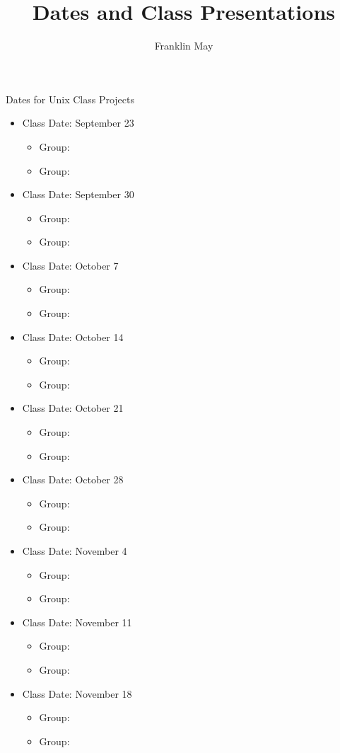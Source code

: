 \documentclass[12pt]{article}
\begin{document}
\author{Franklin May}
\title{Dates and Class Presentations}
\maketitle

Dates for Unix Class Projects
\begin{itemize}
\item Class Date: September 23
\begin{itemize}
\item Group:
\item Group:
\end{itemize}
\item Class Date: September 30
\begin{itemize}
\item Group:
\item Group:
\end{itemize}
\item Class Date: October 7
\begin{itemize}
\item Group:
\item Group:
\end{itemize}
\item Class Date: October 14
\begin{itemize}
\item Group:
\item Group:
\end{itemize}
\item Class Date: October 21
\begin{itemize}
\item Group:
\item Group:
\end{itemize}
\item Class Date: October 28
\begin{itemize}
\item Group:
\item Group:
\end{itemize}
\item Class Date: November 4
\begin{itemize}
\item Group:
\item Group:
\end{itemize}
\item Class Date: November 11
\begin{itemize}
\item Group:
\item Group:
\end{itemize}
\item Class Date: November 18
\begin{itemize}
\item Group:
\item Group:
\end{itemize}
\end{itemize}
\end{document}
